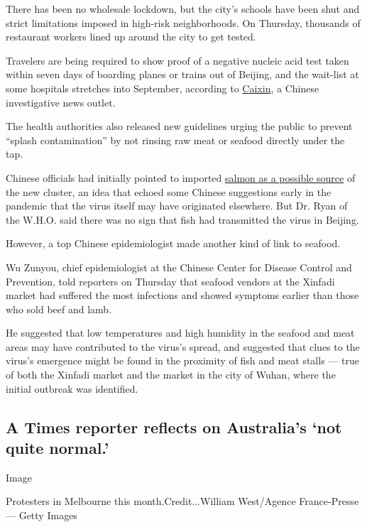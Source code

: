 There has been no wholesale lockdown, but the city's schools have been
shut and strict limitations imposed in high-risk neighborhoods. On
Thursday, thousands of restaurant workers lined up around the city to
get tested.

Travelers are being required to show proof of a negative nucleic acid
test taken within seven days of boarding planes or trains out of
Beijing, and the wait-list at some hospitals stretches into September,
according to
\href{http://china.caixin.com/2020-06-18/101568962.html?cxw=IOS\&Sfrom=Wechat\&originReferrer=iOSshare}{Caixin},
a Chinese investigative news outlet.

The health authorities also released new guidelines urging the public to
prevent ``splash contamination'' by not rinsing raw meat or seafood
directly under the tap.

Chinese officials had initially pointed to imported
\href{https://www.nytimes3xbfgragh.onion/2020/06/18/world/asia/coronavirus-china-salmon.html}{salmon
as a possible source} of the new cluster, an idea that echoed some
Chinese suggestions early in the pandemic that the virus itself may have
originated elsewhere. But Dr. Ryan of the W.H.O. said there was no sign
that fish had transmitted the virus in Beijing.

However, a top Chinese epidemiologist made another kind of link to
seafood.

Wu Zunyou, chief epidemiologist at the Chinese Center for Disease
Control and Prevention, told reporters on Thursday that seafood vendors
at the Xinfadi market had suffered the most infections and showed
symptoms earlier than those who sold beef and lamb.

He suggested that low temperatures and high humidity in the seafood and
meat areas may have contributed to the virus's spread, and suggested
that clues to the virus's emergence might be found in the proximity of
fish and meat stalls --- true of both the Xinfadi market and the market
in the city of Wuhan, where the initial outbreak was identified.

\hypertarget{a-times-reporter-reflects-on-australias-not-quite-normal}{%
\subsection{A Times reporter reflects on Australia's `not quite
normal.'}\label{a-times-reporter-reflects-on-australias-not-quite-normal}}

Image

Protesters in Melbourne this month.Credit...William West/Agence
France-Presse --- Getty Images

